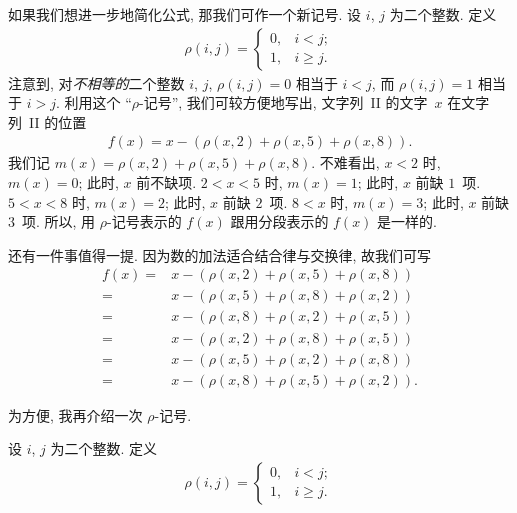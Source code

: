 \begin{example}
    如果我们想进一步地简化公式,
    那我们可作一个新记号.
    设 \(i\), \(j\) 为二个整数.
    定义
    \begin{align*}
        \rho(i, j)
        = \begin{cases}
              0, & i < j;    \\
              1, & i \geq j.
          \end{cases}
    \end{align*}
    注意到, 对\emph{不相等的}二个整数 \(i\), \(j\),
    \(\rho(i, j) = 0\) 相当于 \(i < j\),
    而 \(\rho(i, j) = 1\) 相当于 \(i > j\).
    利用这个 ``\(\rho\)-记号'', 我们可较方便地写出,
    文字列~II 的文字~\(x\) 在文字列~II 的位置
    \begin{align*}
        f(x) = x - (\rho(x, 2) + \rho(x, 5) + \rho(x, 8)).
    \end{align*}
    我们记
    \(m(x) = \rho(x, 2) + \rho(x, 5) + \rho(x, 8)\).
    不难看出,
    \(x < 2\) 时, \(m(x) = 0\);
    此时, \(x\) 前不缺项.
    \(2 < x < 5\) 时, \(m(x) = 1\);
    此时, \(x\) 前缺 \(1\)~项.
    \(5 < x < 8\) 时, \(m(x) = 2\);
    此时, \(x\) 前缺 \(2\)~项.
    \(8 < x\) 时, \(m(x) = 3\);
    此时, \(x\) 前缺 \(3\)~项.
    所以, 用 \(\rho\)-记号表示的 \(f(x)\)
    跟用分段表示的 \(f(x)\) 是一样的.

    还有一件事值得一提.
    因为数的加法适合结合律与交换律,
    故我们可写
    \begin{align*}
        f(x)
        = {} & x - (\rho(x, 2) + \rho(x, 5) + \rho(x, 8))  \\
        = {} & x - (\rho(x, 5) + \rho(x, 8) + \rho(x, 2))  \\
        = {} & x - (\rho(x, 8) + \rho(x, 2) + \rho(x, 5))  \\
        = {} & x - (\rho(x, 2) + \rho(x, 8) + \rho(x, 5))  \\
        = {} & x - (\rho(x, 5) + \rho(x, 2) + \rho(x, 8))  \\
        = {} & x - (\rho(x, 8) + \rho(x, 5) + \rho(x, 2)).
    \end{align*}
\end{example}

为方便, 我再介绍一次 \(\rho\)-记号.

\begin{definition}[\(\rho\)-记号]
    设 \(i\), \(j\) 为二个整数.
    定义
    \begin{align*}
        \rho(i, j)
        = \begin{cases}
              0, & i < j;    \\
              1, & i \geq j.
          \end{cases}
    \end{align*}
\end{definition}

